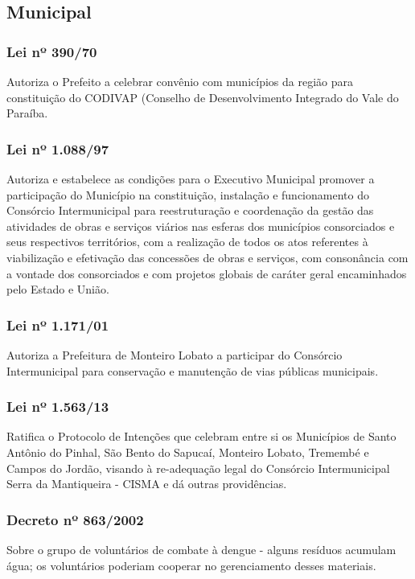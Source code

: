 \begin{subapend}
	\subsection{Municipal}
	\begin{subsubapend}
		\item \subsubsection{Lei nº 390/70}
		Autoriza o Prefeito a celebrar convênio com municípios da região para constituição do CODIVAP (Conselho de Desenvolvimento Integrado do Vale do Paraíba.
		\subsubsection{Lei nº 1.088/97}
		Autoriza e estabelece as condições para o Executivo Municipal promover a participação do Município na constituição, instalação e funcionamento do Consórcio Intermunicipal para reestruturação e coordenação da gestão das atividades de obras e serviços viários nas esferas dos municípios consorciados e seus respectivos territórios, com a realização de todos os atos referentes à viabilização e efetivação das concessões de obras e serviços, com consonância com a vontade dos consorciados e com projetos globais de caráter geral encaminhados pelo Estado e União.
		\subsubsection{Lei nº 1.171/01}
		Autoriza a Prefeitura de Monteiro Lobato a participar do Consórcio Intermunicipal para conservação e manutenção de vias públicas municipais.
		\subsubsection{Lei nº 1.563/13}
		Ratifica o Protocolo de Intenções que celebram entre si os Municípios de Santo Antônio do Pinhal, São Bento do Sapucaí, Monteiro Lobato, Tremembé e Campos do Jordão, visando à re-adequação legal do Consórcio Intermunicipal Serra da Mantiqueira - CISMA e dá outras providências.
		\subsubsection{Decreto nº 863/2002}
		Sobre o grupo de voluntários de combate à dengue - alguns resíduos acumulam água; os voluntários poderiam cooperar no gerenciamento desses materiais.
	\end{subsubapend}
\end{subapend}

